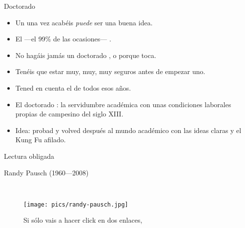 \documentclass[14pt]{beamer}
\newcommand{\WebLink}[2]{
  \href{#1}{\structure{\PointingHand~\color{sail-green}{#2}}}
}
\begin{document}
\begin{frame}{Doctorado}
  \begin{itemize}
    \item Un  una vez acabéis \emph{puede} ser una
      buena idea.
    \item El  —el 99\% de las ocasiones—
      .
    \item No hagáis jamás un doctorado , o
      porque toca.
    \item Tenéis que estar muy, muy, muy seguros antes de empezar uno.
    \item Tened en cuenta el  de todos
      esos años.
    \item El doctorado :
      la servidumbre académica con unas condiciones laborales propias
      de campesino del siglo XIII.
    \item Idea: probad  y volved
      después al mundo académico con las ideas claras y el Kung Fu
      afilado.
  \end{itemize}

  \begin{block}{\centering \small Lectura obligada}
    \centering \small
      \WebLink{http://matt.might.net/articles/phd-school-in-pictures/}
              {The illustrated guide to a Ph.D.}
  \end{block}

\end{frame}

\begin{frame}{Randy Pausch (1960---2008)}

  \begin{center}
    \WebLink{https://www.youtube.com/watch?v=ji5_MqicxSo}
            {The Last Lecture: Achieving Your Childhood Dreams}

            \CrossedBox \\
    \WebLink{https://www.youtube.com/watch?v=oTugjssqOT0}
            {Time Management}
  \end{center}

  \begin{figure}
    \centering
    \texttt{[image: pics/randy-pausch.jpg]}
    \caption*{\small Si sólo vais a hacer click en dos enlaces, }
  \end{figure}

\end{frame}
\end{document}
